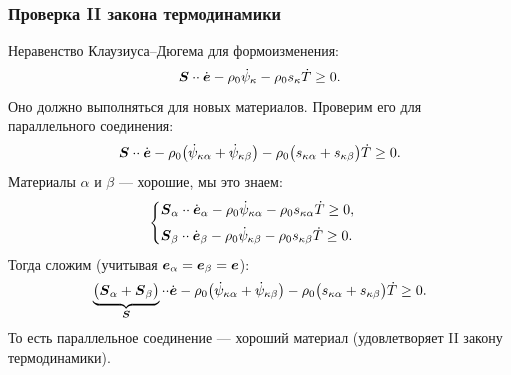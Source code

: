 \subsubsection*{Проверка II закона термодинамики}

Неравенство Клаузиуса–Дюгема для формоизменения:
\[
  \boldsymbol{S} \mathbin{\cdot\cdot} \dot{\boldsymbol{e}} - \rho_0 \dot{\psi}_\kappa - \rho_0 s_\kappa \dot{T} \ge 0 .
\]
Оно должно выполняться для новых материалов. Проверим его для параллельного
соединения:
\[
  \boldsymbol{S} \mathbin{\cdot\cdot} \dot{\boldsymbol{e}}
  - \rho_0\bigl(\dot{\psi}_{\kappa\alpha} + \dot{\psi}_{\kappa\beta}\bigr)
  - \rho_0\bigl(s_{\kappa\alpha} + s_{\kappa\beta}\bigr)\dot{T} \ge 0 .
\]
Материалы $\alpha$ и $\beta$ — хорошие, мы это знаем:
\[
  \begin{cases}
    \boldsymbol{S}_\alpha \mathbin{\cdot\cdot} \dot{\boldsymbol{e}}_\alpha - \rho_0 \dot{\psi}_{\kappa\alpha}
      - \rho_0 s_{\kappa\alpha}\dot{T} \ge 0, \\[0.4em]
    \boldsymbol{S}_\beta \mathbin{\cdot\cdot} \dot{\boldsymbol{e}}_\beta - \rho_0 \dot{\psi}_{\kappa\beta}
      - \rho_0 s_{\kappa\beta}\dot{T} \ge 0 .
  \end{cases}
\]
Тогда сложим (учитывая $\boldsymbol{e}_\alpha = \boldsymbol{e}_\beta = \boldsymbol{e}$):
\[
  \underbrace{\bigl(\boldsymbol{S}_\alpha + \boldsymbol{S}_\beta\bigr)}_{\boldsymbol{S}} \mathbin{\cdot\cdot} \dot{\boldsymbol{e}}
  - \rho_0\bigl(\dot{\psi}_{\kappa\alpha} + \dot{\psi}_{\kappa\beta}\bigr)
  - \rho_0\bigl(s_{\kappa\alpha} + s_{\kappa\beta}\bigr)\dot{T} \ge 0 .
\]
То есть параллельное соединение — хороший материал (удовлетворяет II закону
термодинамики).
